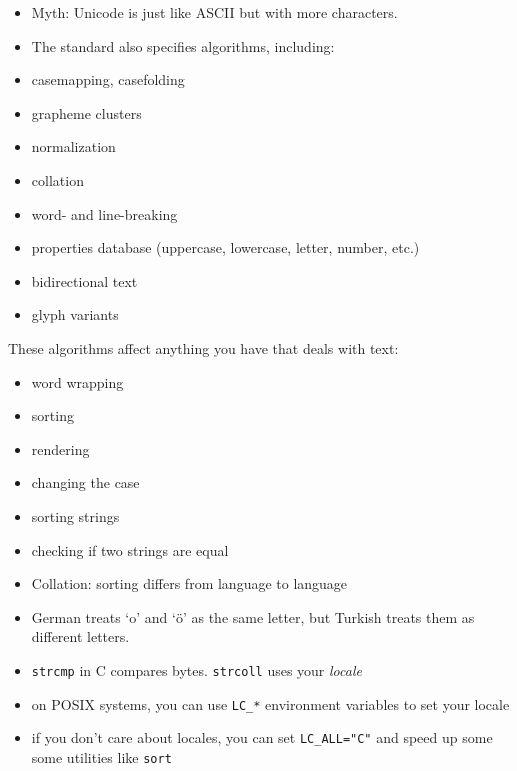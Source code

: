 \documentclass[%
        hyperref={%
                pdfauthor={Zakariyya Mughal},%
                pdfpagemode={None},pdfpagelayout={SinglePage}}%
        xcolor={x11names},%
]{beamer}
\begin{document}
\begin{frame}
\begin{itemize}
\item Myth: Unicode is just like ASCII but with more characters.
\item The standard also specifies algorithms, including:
\end{itemize}
\end{frame}


\begin{frame}
\begin{itemize}
\item casemapping, casefolding
\item grapheme clusters
\item normalization
\item collation
\item word- and line-breaking
\item properties database (uppercase, lowercase, letter, number, etc.)
\item bidirectional text
\item glyph variants
\end{itemize}
\end{frame}

\begin{frame}
These algorithms affect anything you have that deals with text:
\begin{itemize}
\item word wrapping
\item sorting
\item rendering
\item changing the case
\item sorting strings
\item checking if two strings are equal
\end{itemize}
\end{frame}

\begin{frame}
\begin{itemize}
\item Collation: sorting differs from language to language
\pause\item German treats `o' and `\"o' as the same letter, but
Turkish treats them as different letters.
\pause\item \texttt{strcmp} in C compares bytes. \texttt{strcoll} uses
your \emph{locale}
\item on POSIX systems, you can use \texttt{LC\_*} environment variables to set
your locale
\pause\item if you don't care about locales, you can set
\texttt{LC\_ALL="C"} and speed up some some utilities like
\texttt{sort}
\end{itemize}
\end{frame}
\end{document}
